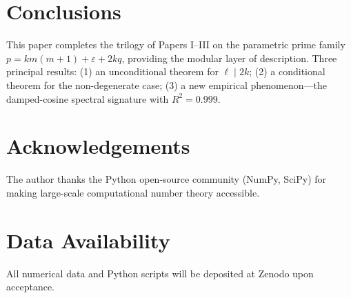 \documentclass[11pt,a4paper]{article}
\theoremstyle{plain}
\theoremstyle{definition}
\newcommand{\eps}{\varepsilon}
\begin{document}
\section{Conclusions}

This paper completes the trilogy of Papers I--III on the parametric prime
family $p = km(m+1) + \eps + 2kq$, providing the modular layer of description.
Three principal results: (1) an unconditional theorem for $\ell \mid 2k$;
(2) a conditional theorem for the non-degenerate case; (3) a new empirical
phenomenon---the damped-cosine spectral signature with $R^2 = 0.999$.

\section*{Acknowledgements}
The author thanks the Python open-source community (NumPy, SciPy) for making
large-scale computational number theory accessible.

\section*{Data Availability}
All numerical data and Python scripts will be deposited at Zenodo upon
acceptance.
\end{document}

